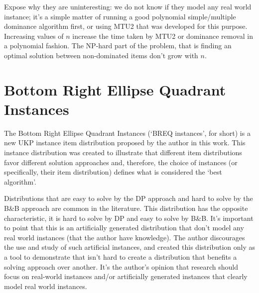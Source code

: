 Expose why they are uninteresting: we do not know if they model any real world instance; it's a simple matter of running a good polynomial simple/multiple dominance algorithm first, or using MTU2 that was developed for this purpose. Increasing values of \(n\) increase the time taken by MTU2 or dominance removal in a polynomial fashion. The NP-hard part of the problem, that is finding an optimal solution between non-dominated items don't grow with \(n\). %

\section{Bottom Right Ellipse Quadrant Instances}

The Bottom Right Ellipse Quadrant Instances (`BREQ instances', for short) is a new UKP instance item distribution proposed by the author in this work. This instance distribution was created to illustrate that different item distributions favor different solution approaches and, therefore, the choice of instances (or specifically, their item distribution) defines what is considered the `best algorithm'.

Distributions that are easy to solve by the DP approach and hard to solve by the B\&B approach are common in the literature. This distribution has the opposite characteristic, it is hard to solve by DP and easy to solve by B\&B. It's important to point that this is an artificially generated distribution that don't model any real world instances (that the author have knowledge). The author discourages the use and study of such artificial instances, and created this distribution only as a tool to demonstrate that isn't hard to create a distribution that benefits a solving approach over another. It's the author's opinion that research should focus on real-world instances and/or artificially generated instances that clearly model real world instances.

